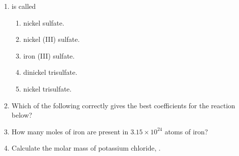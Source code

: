 \documentclass[main.tex]{subfiles}
\begin{document}
\begin{fullwidth}
\begin{multicols*}{2}
\begin{enumerate}
\item {} is called
\begin{enumerate}[label=(\alph*)] 
\item  nickel sulfate.
\item  nickel (III) sulfate.
\item  iron (III) sulfate.
\item  dinickel trisulfate.
\item  nickel trisulfate.
\end{enumerate} 


\item Which of the following correctly gives the best coefficients for the reaction below?
	\begin{center}\end{center}
\begin{enumerate}[label=(\alph*)]\vspace{-0.5cm}
\end{enumerate}\vspace{-0.5cm}

\item How many moles of iron are present in $3.15 \times 10^{24}$ atoms of iron?
\begin{enumerate}[label=(\alph*)]\vspace{-0.5cm}
\end{enumerate}\vspace{-0.5cm}

\item Calculate the molar mass of potassium chloride, .
\begin{enumerate}[label=(\alph*)]\vspace{-0.5cm}
\end{enumerate}\vspace{-0.5cm}


\end{enumerate}
\end{multicols*}
\end{fullwidth}
\end{document}
